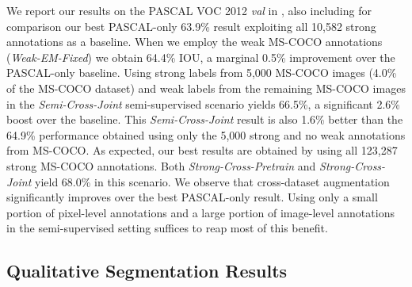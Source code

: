 We report our results on the PASCAL VOC 2012 \textsl{val} in
, also including for comparison our best
PASCAL-only 63.9\% result exploiting all 10,582 strong annotations as
a baseline. When we employ the weak MS-COCO annotations
(\textsl{Weak-EM-Fixed}) we obtain 64.4\% IOU, a marginal 0.5\%
improvement over the PASCAL-only baseline. Using strong labels from
5,000 MS-COCO images (4.0\% of the MS-COCO dataset) and weak labels
from the remaining MS-COCO images in the \textsl{Semi-Cross-Joint}
semi-supervised scenario yields 66.5\%, a significant 2.6\% boost over
the baseline. This \textsl{Semi-Cross-Joint} result is also 1.6\%
better than the 64.9\% performance obtained using only the 5,000
strong and no weak annotations from MS-COCO. As expected, our best
results are obtained by using all 123,287 strong MS-COCO
annotations. Both \textsl{Strong-Cross-Pretrain} and
\textsl{Strong-Cross-Joint} yield 68.0\% in this scenario. We observe
that cross-dataset augmentation significantly improves over the best
PASCAL-only result. Using only a small portion of pixel-level
annotations and a large portion of image-level annotations in the
semi-supervised setting suffices to reap most of this benefit.


\subsection{Qualitative Segmentation Results} 
\label{sec:test_qualitative}

